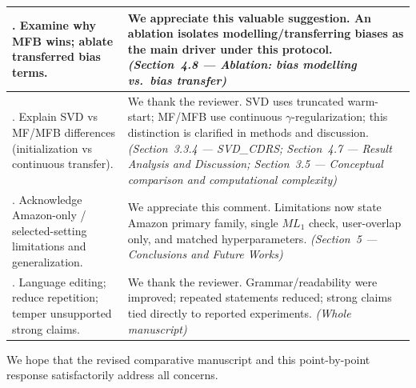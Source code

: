 \documentclass[11pt,a4paper]{article}
\begin{document}
{\begin{longtable}{@{}>{\raggedright\arraybackslash}p{}|>{\raggedright\arraybackslash}p{}@{}}
\midrule
7. Examine why MFB wins; ablate transferred bias terms.
&
We appreciate this valuable suggestion. An ablation isolates modelling/transferring biases as the main driver under this protocol.
\textit{(Section~4.8 --- Ablation: bias modelling vs.\ bias transfer)} \\
\midrule
8. Explain SVD vs MF/MFB differences (initialization vs continuous transfer).
&
We thank the reviewer. SVD uses truncated warm-start; MF/MFB use continuous $\gamma$-regularization; this distinction is clarified in methods and discussion.
\textit{(Section~3.3.4 --- SVD\_CDRS; Section~4.7 --- Result Analysis and Discussion; Section~3.5 --- Conceptual comparison and computational complexity)} \\
\midrule
9. Acknowledge Amazon-only / selected-setting limitations and generalization.
&
We appreciate this comment. Limitations now state Amazon primary family, single $ML_1$ check, user-overlap only, and matched hyperparameters.
\textit{(Section~5 --- Conclusions and Future Works)} \\
\midrule
10. Language editing; reduce repetition; temper unsupported strong claims.
&
We thank the reviewer. Grammar/readability were improved; repeated statements reduced; strong claims tied directly to reported experiments.
\textit{(Whole manuscript)} \\
\bottomrule
\end{longtable}
}

\vspace{0.6em}
\noindent We hope that the revised comparative manuscript and this point-by-point response satisfactorily address all concerns.
\end{document}
